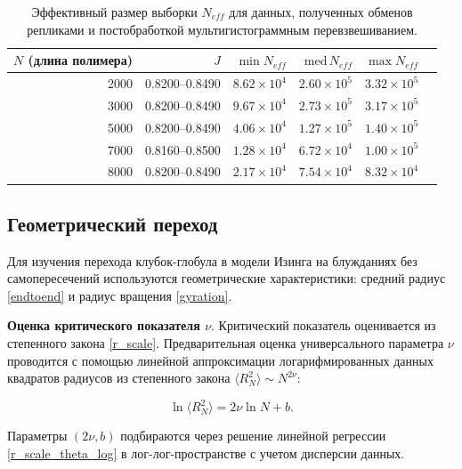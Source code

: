 \begin{table}[htbp]
	\centering
	\scriptsize
	\caption{Эффективный размер выборки $N_{eff}$ для данных, полученных обменов репликами и постобработкой мультигистограммным перевзвешиванием. }
	\label{tab:ising2d-reweight-neff-by-L}
	\begin{tabular}{rrrrrr}
		\toprule
		$N$ (длина полимера) &   $J$ & $\min N_{eff}$ & $\mathrm{med}\,N_{eff}$ & $\max N_{eff}$ \\
	\midrule
	2000 & 0.8200--0.8490 & $8.62\times 10^{4}$ & $2.60\times 10^{5}$ & $3.32\times 10^{5}$ \\
	3000 & 0.8200--0.8490 & $9.67\times 10^{4}$ & $2.73\times 10^{5}$ & $3.17\times 10^{5}$ \\
	5000 & 0.8200--0.8490 & $4.06\times 10^{4}$ & $1.27\times 10^{5}$ & $1.40\times 10^{5}$ \\
	7000 & 0.8160--0.8500 & $1.28\times 10^{4}$ & $6.72\times 10^{4}$ & $1.00\times 10^{5}$ \\
	8000 & 0.8200--0.8490 & $2.17\times 10^{4}$ & $7.54\times 10^{4}$ & $8.32\times 10^{4}$ \\
	\bottomrule
	\end{tabular}
\end{table} 
  
 \subsection{Геометрический переход}
 \label{subsection:ising_2d_struct}
 
 Для изучения перехода клубок-глобула в модели Изинга на блужданиях без  самопересечений используются геометрические характеристики: средний радиус \eqref{endtoend} и радиус вращения \eqref{gyration}. 

 \textbf{Оценка критического показателя $\nu$}.   
Критический показатель оценивается из степенного закона \eqref{r_scale}.   Предварительная оценка универсального параметра $\nu$ проводится с помощью  линейной аппроксимации логарифмированных данных квадратов радиусов из степенного закона $	\langle R_N^2 \rangle \sim N^{2 \nu } $:  

  \begin{equation}
	\label{r_scale_theta_log}
 \ln \langle R_N^2 \rangle  = 2 \nu \ln N +b.  
\end{equation} 


Параметры $(2\nu, b)$ подбираются через решение линейной регрессии \ref{r_scale_theta_log} в лог-лог-пространстве с  учетом дисперсии данных. 

